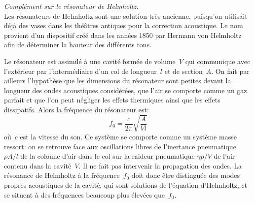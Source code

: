 \begin{histoire}
\emph{Complément sur le résonateur de Helmholtz.}\\
Les résonateurs de Helmholtz sont une solution très ancienne, puisqu'on utilisait déjà des vases dans les théâtres antiques pour la correction acoustique. Le nom provient d'un dispositif créé dans les années 1850 par Hermann von Helmholtz afin de déterminer la hauteur des différents tons. 

\medskip
{}

Le résonateur est assimilé à une cavité fermée de volume~$V$ qui communique avec l'extérieur par l'intermédiaire d'un col de longueur~$l$ et de section~$A$. On fait par ailleurs l'hypothèse que les dimensions du résonateur sont petites devant la longueur des ondes acoustiques considérées, que l'air se comporte comme un gaz parfait et que l'on peut négliger les effets thermiques ainsi que les effets dissipatifs. Alors la fréquence du résonateur est:
\begin{equation}
f_0 = \frac{c}{2 \pi} \sqrt{\frac{A}{V l}}
\end{equation}
où~$c$ est la vitesse du son. Ce système se comporte comme un système masse ressort: on se retrouve face aux oscillations libres de l'inertance pneumatique ${\rho A}/{l}$ de la colonne d'air dans le col sur la raideur pneumatique ${\gamma p}/{V}$ de l'air contenu dans la cavité~$V$. Il ne fait pas intervenir la propagation des ondes. La résonance de Helmholtz à la fréquence~$f_0$ doit donc être distinguée des modes propres acoustiques de la cavité, qui sont solutions de l'équation d'Helmholtz, et se situent à des fréquences beaucoup plus élevées que~$f_0$.
\end{histoire}

